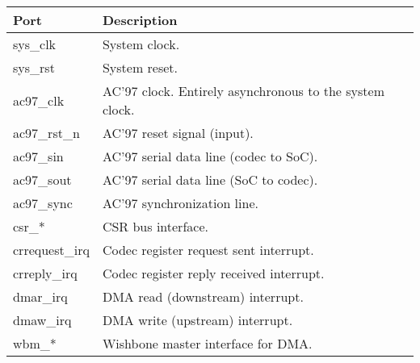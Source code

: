 \documentclass[a4paper,11pt]{article}
\begin{document}
\begin{tabularx}{\textwidth}{|l|X|}
\hline
\textbf{Port} & \textbf{Description} \\
\hline
sys\_clk & System clock. \\
sys\_rst & System reset. \\
\hline
ac97\_clk & AC'97 clock. Entirely asynchronous to the system clock. \\
ac97\_rst\_n & AC'97 reset signal (input). \\
ac97\_sin & AC'97 serial data line (codec to SoC). \\
ac97\_sout & AC'97 serial data line (SoC to codec). \\
ac97\_sync & AC'97 synchronization line. \\
\hline
csr\_* & CSR bus interface. \\
\hline
crrequest\_irq & Codec register request sent interrupt. \\
crreply\_irq & Codec register reply received interrupt. \\
dmar\_irq & DMA read (downstream) interrupt. \\
dmaw\_irq & DMA write (upstream) interrupt. \\
\hline
wbm\_* & Wishbone master interface for DMA. \\
\hline
\end{tabularx}
\end{document}
